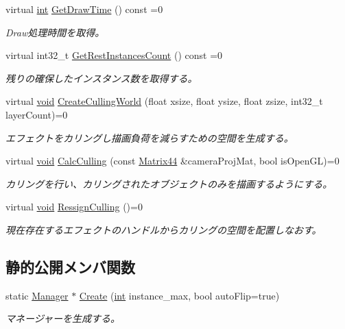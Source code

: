 \begin{DoxyCompactItemize}
virtual \mbox{\hyperlink{namespace_effekseer_ace0abf7c2e6947e519ebe8b54cbcc30a}{int}} \mbox{\hyperlink{class_effekseer_1_1_manager_a24c2805010a8fe5eca1115d48d8c5522}{Get\+Draw\+Time}} () const =0
\begin{DoxyCompactList}\small\item\em Draw処理時間を取得。 \end{DoxyCompactList}\item 
virtual int32\+\_\+t \mbox{\hyperlink{class_effekseer_1_1_manager_acd60c8fb65e5189dd9fb5ed7d3e7cc71}{Get\+Rest\+Instances\+Count}} () const =0
\begin{DoxyCompactList}\small\item\em 残りの確保したインスタンス数を取得する。 \end{DoxyCompactList}\item 
virtual \mbox{\hyperlink{namespace_effekseer_ab34c4088e512200cf4c2716f168deb56}{void}} \mbox{\hyperlink{class_effekseer_1_1_manager_a38e954ce0e584f2830d90b5d7763614b}{Create\+Culling\+World}} (float xsize, float ysize, float zsize, int32\+\_\+t layer\+Count)=0
\begin{DoxyCompactList}\small\item\em エフェクトをカリングし描画負荷を減らすための空間を生成する。 \end{DoxyCompactList}\item 
virtual \mbox{\hyperlink{namespace_effekseer_ab34c4088e512200cf4c2716f168deb56}{void}} \mbox{\hyperlink{class_effekseer_1_1_manager_a95c20ca6352c0e68a6fa1d271bcabc1f}{Calc\+Culling}} (const \mbox{\hyperlink{struct_effekseer_1_1_matrix44}{Matrix44}} \&camera\+Proj\+Mat, bool is\+Open\+GL)=0
\begin{DoxyCompactList}\small\item\em カリングを行い、カリングされたオブジェクトのみを描画するようにする。 \end{DoxyCompactList}\item 
virtual \mbox{\hyperlink{namespace_effekseer_ab34c4088e512200cf4c2716f168deb56}{void}} \mbox{\hyperlink{class_effekseer_1_1_manager_a15bf6eee981b682ed35b7660e8caf435}{Ressign\+Culling}} ()=0
\begin{DoxyCompactList}\small\item\em 現在存在するエフェクトのハンドルからカリングの空間を配置しなおす。 \end{DoxyCompactList}\end{DoxyCompactItemize}
\subsection*{静的公開メンバ関数}
\begin{DoxyCompactItemize}
\item 
static \mbox{\hyperlink{class_effekseer_1_1_manager}{Manager}} $\ast$ \mbox{\hyperlink{class_effekseer_1_1_manager_a1de74a159f3646d325f49e940e72181c}{Create}} (\mbox{\hyperlink{namespace_effekseer_ace0abf7c2e6947e519ebe8b54cbcc30a}{int}} instance\+\_\+max, bool auto\+Flip=true)
\begin{DoxyCompactList}\small\item\em マネージャーを生成する。 \end{DoxyCompactList}\end{DoxyCompactItemize}
